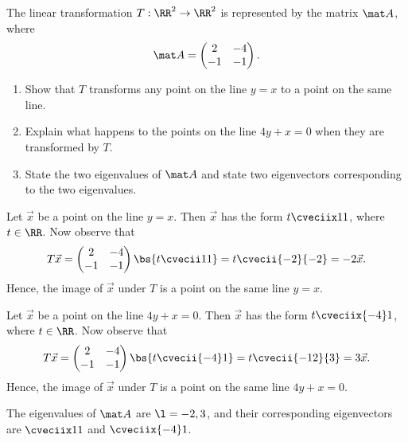 \begin{problem}
    The linear transformation $T : \RR^2 \to \RR^2$ is represented by the matrix $\mat A$, where \[\mat A = \begin{pmatrix}2 & -4 \\ -1 & -1\end{pmatrix}.\]

    \begin{enumerate}
        \item Show that $T$ transforms any point on the line $y = x$ to a point on the same line.
        \item Explain what happens to the points on the line $4y + x = 0$ when they are transformed by $T$.
        \item State the two eigenvalues of $\mat A$ and state two eigenvectors corresponding to the two eigenvalues.
    \end{enumerate}
\end{problem}
\begin{solution}
    \begin{ppart}
        Let $\vec x$ be a point on the line $y = x$. Then $\vec x$ has the form $t \cveciix11$, where $t \in \RR$. Now observe that \[T \vec x = \begin{pmatrix}2 & -4 \\ -1 & -1\end{pmatrix} \bs{t\cvecii11} = t \cvecii{-2}{-2} = -2\vec x.\] Hence, the image of $\vec x$ under $T$ is a point on the same line $y = x$.
    \end{ppart}
    \begin{ppart}
        Let $\vec x$ be a point on the line $4y + x = 0$. Then $\vec x$ has the form $t \cveciix{-4}1$, where $t \in \RR$. Now observe that \[T \vec x = \begin{pmatrix}2 & -4 \\ -1 & -1\end{pmatrix} \bs{t\cvecii{-4}1} = t \cvecii{-12}{3} = 3\vec x.\] Hence, the image of $\vec x$ under $T$ is a point on the same line $4y + x = 0$.
    \end{ppart}
    \begin{ppart}
        The eigenvalues of $\mat A$ are $\l = -2, 3$, and their corresponding eigenvectors are $\cveciix11$ and $\cveciix{-4}1$.
    \end{ppart}
\end{solution}

